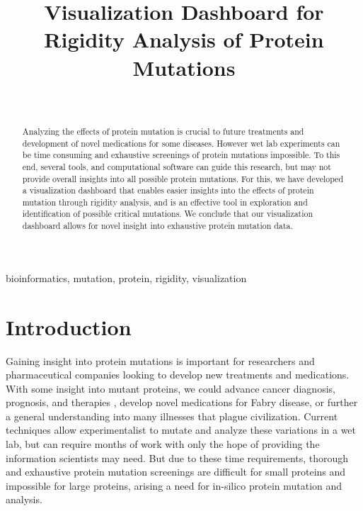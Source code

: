 \documentclass[11pt]{IEEEtran}
\begin{document}
\title{Visualization Dashboard for Rigidity Analysis of Protein Mutations}

\author{\\
}

\maketitle

\begin{abstract}
Analyzing the effects of protein mutation is crucial to future treatments and development of novel medications for some diseases. However wet lab experiments can be time consuming and exhaustive screenings of protein mutations impossible. To this end, several tools, and computational software can guide this research, but may not provide overall insights into all possible protein mutations. For this, we have developed a visualization dashboard that enables easier insights into the effects of protein mutation through rigidity analysis, and is an effective tool in exploration and identification of possible critical mutations. We conclude that our visualization dashboard allows for novel insight into exhaustive protein mutation data.\\
\end{abstract}

\begin{IEEEkeywords}
bioinformatics, mutation, protein, rigidity, visualization
\end{IEEEkeywords}

\section{Introduction}
Gaining insight into protein mutations is important for researchers and pharmaceutical companies looking to develop new treatments and medications. With some insight into mutant proteins, we could advance cancer diagnosis, prognosis, and therapies \cite{b2}, develop novel medications for Fabry disease, or further a general understanding into many illnesses that plague civilization. Current techniques allow experimentalist to mutate and analyze these variations in a wet lab, but can require months of work with only the hope of providing the information scientists may need\cite{b3}. But due to these time requirements, thorough and exhaustive protein mutation screenings are difficult for small proteins and impossible for large proteins, arising a need for in-silico protein mutation and analysis.\\
\end{document}
